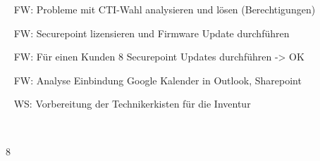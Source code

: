 {{	\textbullet~ FW: Probleme mit CTI-Wahl analysieren und lösen (Berechtigungen)\par
	\textbullet~ FW: Securepoint lizensieren und Firmware Update durchführen\par
	\textbullet~ FW: Für einen Kunden 8 Securepoint Updates durchführen -> OK\par
	\textbullet~ FW: Analyse Einbindung Google Kalender in Outlook, Sharepoint\par
	\textbullet~ WS: Vorbereitung der Technikerkisten für die Inventur\par
	\textbullet~ 
	}{}{8}
}{}
\Unterschrift
\newpage
